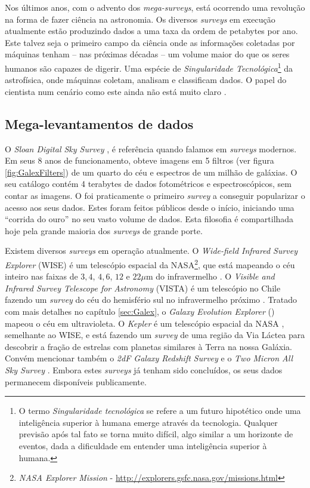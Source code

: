 Nos últimos anos, com o advento dos {\em mega-surveys}, está ocorrendo uma
revolução na forma de fazer ciência na astronomia. Os diversos {\em surveys} em
execução atualmente estão produzindo dados a uma taxa da ordem de petabytes por
ano. Este talvez seja o primeiro campo da ciência onde as informações coletadas
por máquinas tenham -- nas próximas décadas -- um volume maior do que os seres
humanos são capazes de digerir. Uma espécie de {\em Singularidade
Tecnológica}\footnote{O termo {\em Singularidade tecnológica} se refere a um
futuro hipotético onde uma inteligência superior à humana emerge através da
tecnologia. Qualquer previsão após tal fato se torna muito difícil, algo similar
a um horizonte de eventos, dada a dificuldade em entender uma inteligência
superior à humana.} da astrofísica, onde máquinas coletam, analisam e
classificam dados. O papel do cientista num cenário como este ainda não está
muito claro \citep{Norris2010}.

\subsection{Mega-levantamentos de dados}

O {\em Sloan Digital Sky Survey} \citep[\SDSS; ][]{York2000}, é referência
quando falamos em {\em surveys} modernos. Em seus 8 anos de funcionamento, obteve
imagens em 5 filtros (ver figura \ref{fig:GalexFilters}) de um quarto do céu e
espectros de um milhão de galáxias. O seu catálogo contém 4 terabytes de dados
fotométricos e espectroscópicos, sem contar as imagens. O \SDSS foi praticamente
o primeiro {\em survey} a conseguir popularizar o acesso aos seus dados. Estes
foram feitos públicos desde o início, iniciando uma ``corrida do ouro'' no seu
vasto volume de dados. Esta filosofia é compartilhada hoje pela grande maioria
dos {\em surveys} de grande porte.

Existem diversos {\em surveys} em operação atualmente. O {\em Wide-field
Infrared Survey Explorer} (WISE) é um telescópio espacial da NASA\footnote{{\em
NASA Explorer Mission} - \url{http://explorers.gsfc.nasa.gov/missions.html}},
que está mapeando o céu inteiro nas faixas de $3,4$, $4,6$, $12$ e $22\mu$m do
infravermelho \citep{Wright2010}. O {\em Visible and Infrared Survey Telescope
for Astronomy} (VISTA) é um telescópio no Chile fazendo um {\em survey} do céu
do hemisfério sul no infravermelho próximo \citep{Born2010}. Tratado com mais
detalhes no capítulo \ref{sec:Galex}, o {\em Galaxy Evolution Explorer} (\galex)
mapeou o céu em ultravioleta. O {\em Kepler} é um telescópio espacial da NASA
\citep{Borucki2010}, semelhante ao WISE, e está fazendo um {\em survey} de uma
região da Via Láctea para descobrir a fração de estrelas com planetas similares
à Terra na nossa Galáxia. Convém mencionar também o {\em 2dF Galaxy Redshift
Survey} \citep[2dFGRS;][]{Colless1999} e o {\em Two Micron All Sky Survey}
\citep[2MASS;][]{Skrutskie2006}. Embora estes {\em surveys} já tenham sido
concluídos, os seus dados permanecem disponíveis publicamente.

